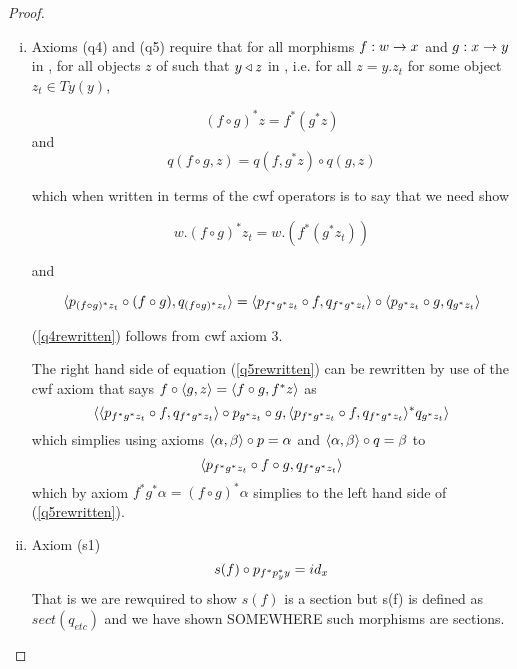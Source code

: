 \begin{proof}
\begin{enumerate}[(i)]
(\ref{q3rewritten})  simplies to
\begin{equation}
\tuple{p_{y_t},q_{y_t}}=id_{x.y_t}
\end{equation}
and this follows by cwf axiom 7.  
\item
Axioms (q4) and (q5) require that 
for all morphisms $f:w \rightarrow x$ and $g:x \rightarrow y$ in \catcw, for all objects $z$ of \catcw such that $y \triangleleft z$ in , i.e. for all $z=y.z_t$ for some object
$z_t \in Ty(y)$,

\begin{equation}
(f \circ g)^*z =  f^* (g ^* z)
\end{equation} 
and
\begin{equation}
q(f \circ g,z) = q(f,g^*z) \circ q(g,z)
\end{equation}

which when written in terms of the cwf operators is to say that we need show

\begin{equation}
w.(f \circ g)^*z_t =  w.(f^* (g ^* z_t))  \label{q4rewritten}
\end{equation}

and 

\begin{equation}
\langle p_{(f \circ g)^*z_t} \circ (f \circ g),q_{(f \circ g)^*z_t}\rangle =  \langle p_{f^*g^*z_t} \circ f,q_{f^*g^*z_t}\rangle \circ \langle p_{g^*z_t} \circ g,q_{g^*z_t}\rangle \label{q5rewritten}
\end{equation}

(\ref{q4rewritten}) follows from cwf axiom 3.

The right hand side of equation (\ref{q5rewritten}) can be rewritten by use of the cwf axiom that says $f \circ \langle g,z\rangle=\langle f\circ g,f^*z\rangle$ as
\begin{equation*}
\langle
    \langle p_{f^*g^*z_t} \circ f,q_{f^*g^*z_t}\rangle \circ p_{g^*z_t} \circ g,
		\langle p_{f^*g^*z_t} \circ f,q_{f^*g^*z_t}\rangle ^* q_{g^*z_t}
\rangle
\end{equation*} 
which simplies using axioms $\langle\alpha,\beta\rangle\circ p = \alpha$ and $\langle\alpha,\beta\rangle\circ q = \beta$
to 
\begin{equation*}
\langle
    p_{f^*g^*z_t} \circ f  \circ g,
		q_{f^*g^*z_t}
\rangle
\end{equation*}
which by axiom $f^*g^*\alpha=(f \circ g)^* \alpha$ simplies to the left hand side of (\ref{q5rewritten}).
\item
Axiom (s1) 
\begin{equation}
s(f) \circ p_{f^* p_y ^* y}=id_x
\end{equation}
That is we are rewquired to show $s(f)$ is a section but s(f) is defined as $sect(q_{etc})$ 
and we have shown SOMEWHERE such morphisms are sections.


\end{enumerate}
\end{proof}
